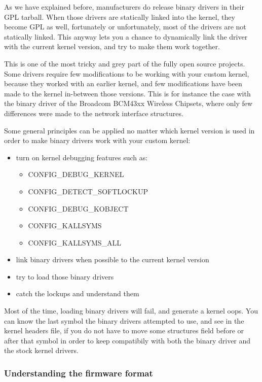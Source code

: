 As we have explained before, manufacturers do release binary drivers in their GPL
tarball. When those drivers are statically linked into the kernel, they become GPL
as well, fortunately or unfortunately, most of the drivers are not statically linked.
This anyway lets you a chance to dynamically link the driver with the current kernel
version, and try to make them work together.

This is one of the most tricky and grey part of the fully open source projects. 
Some drivers require few modifications to be working with your custom kernel, 
because they worked with an earlier kernel, and few modifications have been made
to the kernel in-between those versions. This is for instance the case with the 
binary driver of the Broadcom BCM43xx Wireless Chipsets, where only few differences
were made to the network interface structures.

Some general principles can be applied no matter which kernel version is used in
order to make binary drivers work with your custom kernel:

\begin{itemize}
\item turn on kernel debugging features such as:
\begin{itemize}
\item CONFIG\_DEBUG\_KERNEL
\item CONFIG\_DETECT\_SOFTLOCKUP
\item CONFIG\_DEBUG\_KOBJECT
\item CONFIG\_KALLSYMS
\item CONFIG\_KALLSYMS\_ALL
\end{itemize}
\item link binary drivers when possible to the current kernel version
\item try to load those binary drivers
\item catch the lockups and understand them
\end{itemize}

Most of the time, loading binary drivers will fail, and generate a kernel oops. 
You can know the last symbol the binary drivers attempted to use, and see in the
kernel headers file, if you do not have to move some structures field before or 
after that symbol in order to keep compatibily with both the binary driver and 
the stock kernel drivers.

\subsubsection{Understanding the firmware format}

